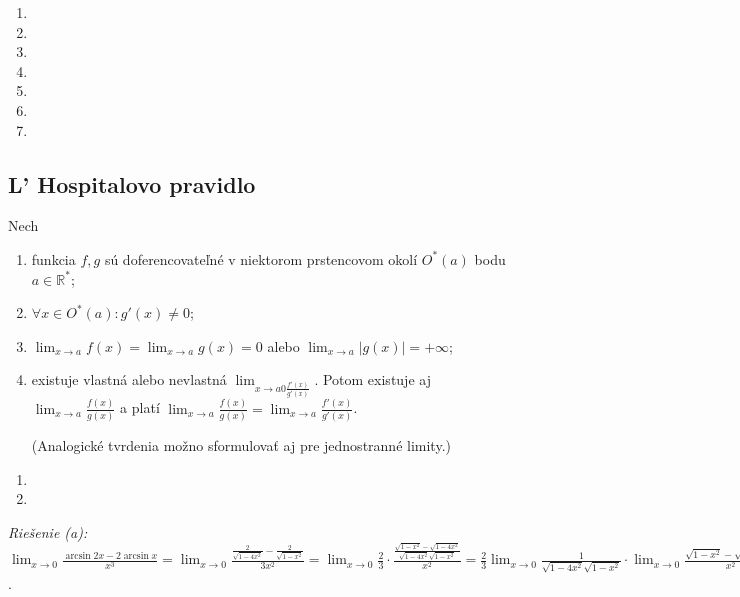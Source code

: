 \begin{enumerate}[resume]
	\item {}
	\item {}
	\item {}
	\item {}
	\item {}
	\item {}
	\item {}
\end{enumerate}

\subsection{L' Hospitalovo pravidlo}
\begin{veta}
Nech
\begin{enumerate}
\item funkcia $f,g$ sú doferencovateľné v niektorom prstencovom okolí $O^*(a)$ bodu $a\in\mathbb{R^*}$;
\item $\forall x\in O^*(a):g'(x)\neq 0$;
\item $\lim_{x\rightarrow a}f(x)=\lim_{x\rightarrow a}g(x)=0$ alebo $\lim_{x\rightarrow a}|g(x)|=+\infty$;
\item existuje vlastná alebo nevlastná $\lim_{x\rightarrow a0\frac{f'(x)}{g'(x)}}$. Potom existuje aj $\lim_{x\rightarrow a}\frac{f(x)}{g(x)}$ a platí $\lim_{x\rightarrow a}\frac{f(x)}{g(x)}=\lim_{x\rightarrow a}\frac{f'(x)}{g'(x)}$.

(Analogické tvrdenia možno sformulovať aj pre jednostranné limity.)
\end{enumerate}
\end{veta}

\begin{enumerate}[resume]
	\item {}
	\item {}
\end{enumerate}

\textit{Riešenie (a):}
$\lim_{x\rightarrow 0}\frac{\arcsin 2x-2\arcsin x}{x^3}=\lim_{x\rightarrow 0}\frac{\frac{2}{\sqrt{1-4x^2}}-\frac{2}{\sqrt{1-x^2}}}{3x^2}=\lim_{x\rightarrow 0}\frac{2}{3}\cdot\frac{\frac{\sqrt{1-x^2}-\sqrt{1-4x^2}}{\sqrt{1-4x^2}\sqrt{1-x^2}}}{x^2}=\frac{2}{3}\lim_{x\rightarrow 0}\frac{1}{\sqrt{1-4x^2}\sqrt{1-x^2}}\cdot \lim_{x\rightarrow 0}\frac{\sqrt{1-x^2}-\sqrt{1-4x^2}}{x^2}=\frac{2}{3}\cdot \lim_{x\rightarrow 0}\frac{\frac{4x}{\sqrt{1-4x^2}}-\frac{x}{\sqrt{1-x^2}}}{2x}=\frac{2}{1}\cdot\frac{1}{2}\cdot \lim_{x\rightarrow 0}(\frac{4}{\sqrt{1-4x^2}}-\frac{1}{\sqrt{1-x^2}})=1$.

